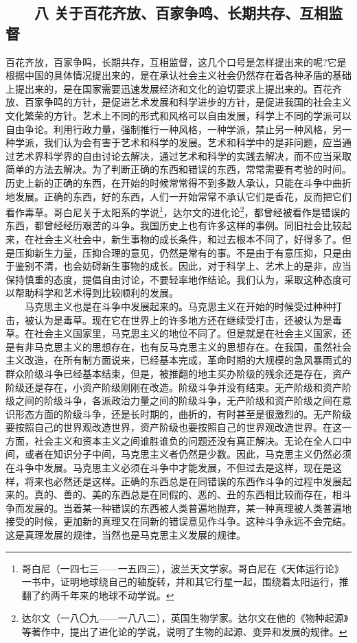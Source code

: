 \documentclass[cn,11pt,chinese]{elegantbook}
\def\myformat#1{\hfil\hfil #1}
\begin{document}
\subsection*{\myformat{　　八 关于百花齐放、百家争鸣、长期共存、互相监督}}
百花齐放，百家争鸣，长期共存，互相监督，这几个口号是怎样提出来的呢?它是根据中国的具体情况提出来的，是在承认社会主义社会仍然存在着各种矛盾的基础上提出来的，是在国家需要迅速发展经济和文化的迫切要求上提出来的。百花齐放、百家争鸣的方针，是促进艺术发展和科学进步的方针，是促进我国的社会主义文化繁荣的方针。艺术上不同的形式和风格可以自由发展，科学上不同的学派可以自由争论。利用行政力量，强制推行一种风格，一种学派，禁止另一种风格，另一种学派，我们认为会有害于艺术和科学的发展。艺术和科学中的是非问题，应当通过艺术界科学界的自由讨论去解决，通过艺术和科学的实践去解决，而不应当采取简单的方法去解决。为了判断正确的东西和错误的东西，常常需要有考验的时间。历史上新的正确的东西，在开始的时候常常得不到多数人承认，只能在斗争中曲折地发展。正确的东西，好的东西，人们一开始常常不承认它们是香花，反而把它们看作毒草。哥白尼关于太阳系的学说\footnote[1]{ 哥白尼（一四七三——一五四三），波兰天文学家。哥白尼在《天体运行论》一书中，证明地球绕自己的轴旋转，并和其它行星一起，围绕着太阳运行，推翻了约两千年来的地球不动学说。}，达尔文的进化论\footnote[2]{ 达尔文（一八〇九——一八八二），英国生物学家。达尔文在他的《物种起源》等著作中，提出了进化论的学说，说明了生物的起源、变异和发展的规律。}，都曾经被看作是错误的东西，都曾经经历艰苦的斗争。我国历史上也有许多这样的事例。同旧社会比较起来，在社会主义社会中，新生事物的成长条件，和过去根本不同了，好得多了。但是压抑新生力量，压抑合理的意见，仍然是常有的事。不是由于有意压抑，只是由于鉴别不清，也会妨碍新生事物的成长。因此，对于科学上、艺术上的是非，应当保持慎重的态度，提倡自由讨论，不要轻率地作结论。我们认为，采取这种态度可以帮助科学和艺术得到比较顺利的发展。\\
　　马克思主义也是在斗争中发展起来的。马克思主义在开始的时候受过种种打击，被认为是毒草。现在它在世界上的许多地方还在继续受打击，还被认为是毒草。在社会主义国家里，马克思主义的地位不同了。但是就是在社会主义国家，还是有非马克思主义的思想存在，也有反马克思主义的思想存在。在我国，虽然社会主义改造，在所有制方面说来，已经基本完成，革命时期的大规模的急风暴雨式的群众阶级斗争已经基本结束，但是，被推翻的地主买办阶级的残余还是存在，资产阶级还是存在，小资产阶级刚刚在改造。阶级斗争并没有结束。无产阶级和资产阶级之间的阶级斗争，各派政治力量之间的阶级斗争，无产阶级和资产阶级之间在意识形态方面的阶级斗争，还是长时期的，曲折的，有时甚至是很激烈的。无产阶级要按照自己的世界观改造世界，资产阶级也要按照自己的世界观改造世界。在这一方面，社会主义和资本主义之间谁胜谁负的问题还没有真正解决。无论在全人口中间，或者在知识分子中间，马克思主义者仍然是少数。因此，马克思主义仍然必须在斗争中发展。马克思主义必须在斗争中才能发展，不但过去是这样，现在是这样，将来也必然还是这样。正确的东西总是在同错误的东西作斗争的过程中发展起来的。真的、善的、美的东西总是在同假的、恶的、丑的东西相比较而存在，相斗争而发展的。当着某一种错误的东西被人类普遍地抛弃，某一种真理被人类普遍地接受的时候，更加新的真理又在同新的错误意见作斗争。这种斗争永远不会完结。这是真理发展的规律，当然也是马克思主义发展的规律。\\
\end{document}

